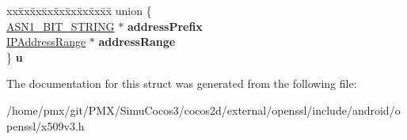 \begin{DoxyCompactItemize}
\begin{tabbing}
\end{tabbing}\item 
\mbox{\label{structIPAddressOrRange__st_a7626429f007cc10821cf0f02d1f60238}} 
\begin{tabbing}
xx\=xx\=xx\=xx\=xx\=xx\=xx\=xx\=xx\=\kill
union \{\\
\>\hyperlink{structasn1__string__st}{ASN1\_BIT\_STRING} $\ast$ {\bfseries addressPrefix}\\
\>\hyperlink{structIPAddressRange__st}{IPAddressRange} $\ast$ {\bfseries addressRange}\\
\} {\bfseries u}\\

\end{tabbing}\end{DoxyCompactItemize}


The documentation for this struct was generated from the following file\+:\begin{DoxyCompactItemize}
\item 
/home/pmx/git/\+P\+M\+X/\+Simu\+Cocos3/cocos2d/external/openssl/include/android/openssl/x509v3.\+h\end{DoxyCompactItemize}
